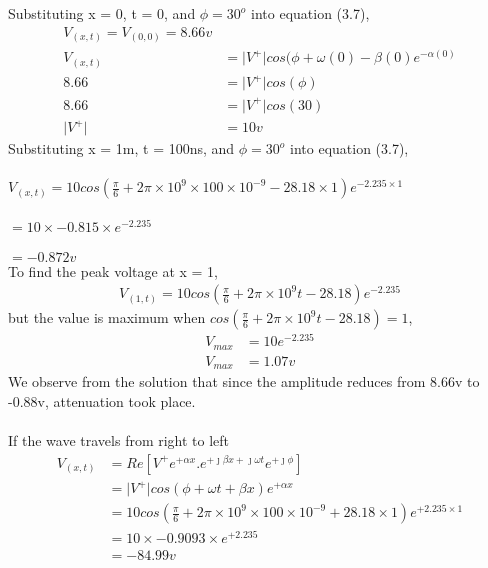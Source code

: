 \begin{exmp}
	Substituting x = 0, t = 0, and $\phi = 30^o$ into equation (3.7),
	\begin{align*}
	V_{(x,t)} = V_{(0,0)} = 8.66v \\
	V_{(x,t)} &= \lvert V^+\rvert cos(\phi + \omega (0) - \beta (0)e^{-\alpha (0)}\\
	8.66 &= \lvert V^+\rvert cos(\phi)\\
	8.66 &= \lvert V^+\rvert cos(30)\\
	\lvert V^+\rvert &= 10v
	\end{align*}
	Substituting x = 1m, t = 100ns, and $\phi = 30^o$ into equation (3.7),\\\\
	$ V_{(x,t)} = 10 cos(\frac{\pi}{6} + 2\pi \times 10^9\times 100\times 10^{-9} - 28.18\times 1)e^{-2.235\times 1} $\\\\
	$ = 10 \times -0.815 \times e^{-2.235} $\\\\
	$ = -0.872v $\\
	To find the peak voltage at x = 1,
	\begin{align*}
	V_{(1,t)} = 10cos(\frac{\pi}{6} + 2\pi \times 10^9t - 28.18)e^{-2.235}
	\end{align*}
	but the value is maximum when $cos(\frac{\pi}{6} + 2\pi \times 10^9t - 28.18) = 1$, 
	\begin{align*}
	V_{max} &= 10e^{-2.235}\\
	V_{max} &= 1.07v
	\end{align*}
	We observe from the solution that since the amplitude reduces from 8.66v to -0.88v, attenuation took place.\\ \\
	If the wave travels from right to left
	\begin{align*}
	V_{(x,t)} &= Re{[V^+ e^{+\alpha x}.e^{+\jmath\beta x + \jmath\omega t}e^{+\jmath\phi}]}\\
	&= \lvert V^+\rvert cos(\phi + \omega t + \beta x)e^{+\alpha x}\\
	&= 10 cos(\frac{\pi}{6} + 2\pi \times 10^9\times 100\times 10^{-9} + 28.18\times 1)e^{+2.235\times 1}\\
	&= 10 \times -0.9093 \times e^{+2.235}\\
	&= -84.99v
	\end{align*} 	
\end{exmp}

